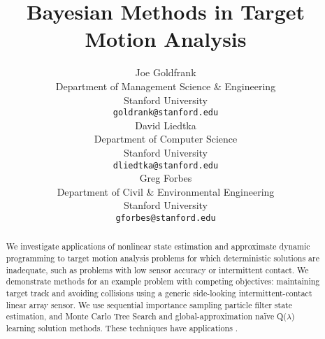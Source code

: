 \documentclass{article}
\title{Bayesian Methods in Target Motion Analysis}
\author{
  Joe Goldfrank\\
  Department of Management Science \& Engineering\\
  Stanford University\\
  \texttt{goldrank@stanford.edu} \\
  \And
  David Liedtka \\
  Department of Computer Science \\
  Stanford University\\
  \texttt{dliedtka@stanford.edu} \\
  \AND
  Greg Forbes \\
  Department of Civil \& Environmental Engineering \\
  Stanford University \\
  \texttt{gforbes@stanford.edu} \\
}
\begin{document}

\maketitle

\begin{abstract}
  We investigate applications of nonlinear state estimation and approximate dynamic programming to target motion analysis problems for which deterministic solutions are inadequate, such as problems with low sensor accuracy or intermittent contact. We demonstrate methods for an example problem with competing objectives: maintaining target track and avoiding collisions using a generic side-looking intermittent-contact linear array sensor. We use sequential importance sampling particle filter state estimation, and Monte Carlo Tree Search and global-approximation naïve Q($\lambda$) learning solution methods. These techniques have applications .
\end{abstract}
\end{document}
